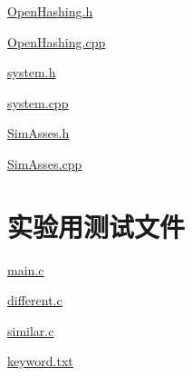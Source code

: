 \documentclass[a4paper]{article}
\begin{document}
    \href{../exp6/OpenHashing.h.txt}{\underline{OpenHashing.h}}

    \href{../exp6/OpenHashing.cpp.txt}{\underline{OpenHashing.cpp}}

    \href{../exp6/system.h.txt}{\underline{system.h}}

    \href{../exp6/system.cpp.txt}{\underline{system.cpp}}

    \href{../exp6/SimAsses.h.txt}{\underline{SimAsses.h}}

    \href{../exp6/SimAsses.cpp.txt}{\underline{SimAsses.cpp}}


    \section{实验用测试文件}\label{sec:appendix2}
    \href{../exp6/file/main.c.txt}{\underline{main.c}}

    \href{../exp6/file/different.c.txt}{\underline{different.c}}

    \href{../exp6/file/similar.c.txt}{\underline{similar.c}}

    \href{../exp6/file/keyword.txt}{\underline{keyword.txt}}
\end{document}
